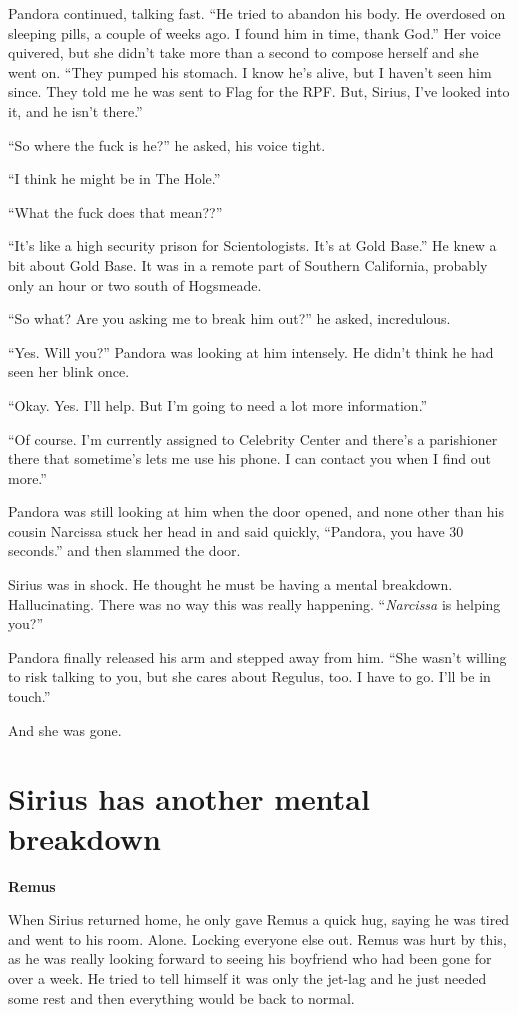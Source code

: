 \documentclass[12pt,twoside,openright]{memoir}
\begin{document}
Pandora continued, talking fast. ``He tried to abandon his body. He overdosed on sleeping pills, a couple of weeks ago. I found him in time, thank God.'' Her voice quivered, but she didn't take more than a second to compose herself and she went on. ``They pumped his stomach. I know he's alive, but I haven't seen him since. They told me he was sent to Flag for the RPF. But, Sirius, I've looked into it, and he isn't there.''

``So where the fuck is he?'' he asked, his voice tight.

``I think he might be in The Hole.''

``What the fuck does that mean??''

``It's like a high security prison for Scientologists. It's at Gold Base.'' He knew a bit about Gold Base. It was in a remote part of Southern California, probably only an hour or two south of Hogsmeade.

``So what? Are you asking me to break him out?'' he asked, incredulous. 

``Yes. Will you?'' Pandora was looking at him intensely. He didn't think he had seen her blink once.

``Okay. Yes. I'll help. But I'm going to need a lot more information.''

``Of course. I'm currently assigned to Celebrity Center and there's a parishioner there that sometime's lets me use his phone. I can contact you when I find out more.'' 

Pandora was still looking at him when the door opened, and none other than his cousin Narcissa stuck her head in and said quickly, ``Pandora, you have 30 seconds.'' and then slammed the door.

Sirius was in shock. He thought he must be having a mental breakdown. Hallucinating. There was no way this was really happening. ``\textit{Narcissa} is helping you?'' 

Pandora finally released his arm and stepped away from him. ``She wasn't willing to risk talking to you, but she cares about Regulus, too. I have to go. I'll be in touch.''

And she was gone.

\chapter{Sirius has another mental breakdown}

\textbf{Remus} 

When Sirius returned home, he only gave Remus a quick hug, saying he was tired and went to his room. Alone. Locking everyone else out. Remus was hurt by this, as he was really looking forward to seeing his boyfriend who had been gone for over a week. He tried to tell himself it was only the jet-lag and he just needed some rest and then everything would be back to normal. 
\end{document}
